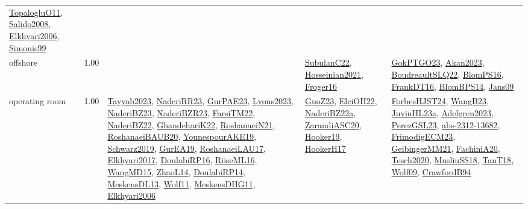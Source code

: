 {\begin{longtable}{p{3cm}r>{\raggedright\arraybackslash}p{6cm}>{\raggedright\arraybackslash}p{6cm}>{\raggedright\arraybackslash}p{8cm}}
\hyperref[detail:TopalogluO11]{TopalogluO11}, \hyperref[detail:Salido2008]{Salido2008}, \hyperref[detail:Elkhyari2006]{Elkhyari2006}, \hyperref[detail:Simonis99]{Simonis99}\\
\index{offshore}\index{ApplicationAreas!offshore}offshore &  1.00 &  & \hyperref[detail:SubulanC22]{SubulanC22}, \hyperref[detail:Hosseinian2021]{Hosseinian2021}, \hyperref[detail:Froger16]{Froger16} & \hyperref[detail:GokPTGO23]{GokPTGO23}, \hyperref[detail:Akan2023]{Akan2023}, \hyperref[detail:BoudreaultSLQ22]{BoudreaultSLQ22}, \hyperref[detail:BlomPS16]{BlomPS16}, \hyperref[detail:FrankDT16]{FrankDT16}, \hyperref[detail:BlomBPS14]{BlomBPS14}, \hyperref[detail:Jans09]{Jans09}\\
\index{operating room}\index{ApplicationAreas!operating room}operating room &  1.00 & \hyperref[detail:Tayyab2023]{Tayyab2023}, \hyperref[detail:NaderiRR23]{NaderiRR23}, \hyperref[detail:GurPAE23]{GurPAE23}, \hyperref[detail:Lyons2023]{Lyons2023}, \hyperref[detail:NaderiBZ23]{NaderiBZ23}, \hyperref[detail:NaderiBZR23]{NaderiBZR23}, \hyperref[detail:FarsiTM22]{FarsiTM22}, \hyperref[detail:NaderiBZ22]{NaderiBZ22}, \hyperref[detail:GhandehariK22]{GhandehariK22}, \hyperref[detail:RoshanaeiN21]{RoshanaeiN21}, \hyperref[detail:RoshanaeiBAUB20]{RoshanaeiBAUB20}, \hyperref[detail:YounespourAKE19]{YounespourAKE19}, \hyperref[detail:Schwarz2019]{Schwarz2019}, \hyperref[detail:GurEA19]{GurEA19}, \hyperref[detail:RoshanaeiLAU17]{RoshanaeiLAU17}, \hyperref[detail:Elkhyari2017]{Elkhyari2017}, \hyperref[detail:DoulabiRP16]{DoulabiRP16}, \hyperref[detail:RiiseML16]{RiiseML16}, \hyperref[detail:WangMD15]{WangMD15}, \hyperref[detail:ZhaoL14]{ZhaoL14}, \hyperref[detail:DoulabiRP14]{DoulabiRP14}, \hyperref[detail:MeskensDL13]{MeskensDL13}, \hyperref[detail:Wolf11]{Wolf11}, \hyperref[detail:MeskensDHG11]{MeskensDHG11}, \hyperref[detail:Elkhyari2006]{Elkhyari2006} & \hyperref[detail:GuoZ23]{GuoZ23}, \hyperref[detail:ElciOH22]{ElciOH22}, \hyperref[detail:NaderiBZ22a]{NaderiBZ22a}, \hyperref[detail:ZarandiASC20]{ZarandiASC20}, \hyperref[detail:Hooker19]{Hooker19}, \hyperref[detail:HookerH17]{HookerH17} & \hyperref[detail:ForbesHJST24]{ForbesHJST24}, \hyperref[detail:WangB23]{WangB23}, \hyperref[detail:JuvinHL23a]{JuvinHL23a}, \hyperref[detail:Adelgren2023]{Adelgren2023}, \hyperref[detail:PerezGSL23]{PerezGSL23}, \hyperref[detail:abs-2312-13682]{abs-2312-13682}, \hyperref[detail:FrimodigECM23]{FrimodigECM23}, \hyperref[detail:GeibingerMM21]{GeibingerMM21}, \hyperref[detail:FachiniA20]{FachiniA20}, \hyperref[detail:Tesch2020]{Tesch2020}, \hyperref[detail:MusliuSS18]{MusliuSS18}, \hyperref[detail:TanT18]{TanT18}, \hyperref[detail:Wolf09]{Wolf09}, \hyperref[detail:CrawfordB94]{CrawfordB94}\\

\end{longtable}}
